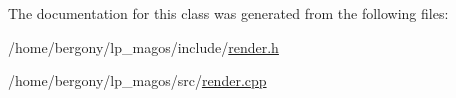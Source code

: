 The documentation for this class was generated from the following files\+:\begin{DoxyCompactItemize}
\item 
/home/bergony/lp\+\_\+magos/include/\hyperlink{render_8h}{render.\+h}\item 
/home/bergony/lp\+\_\+magos/src/\hyperlink{render_8cpp}{render.\+cpp}\end{DoxyCompactItemize}
